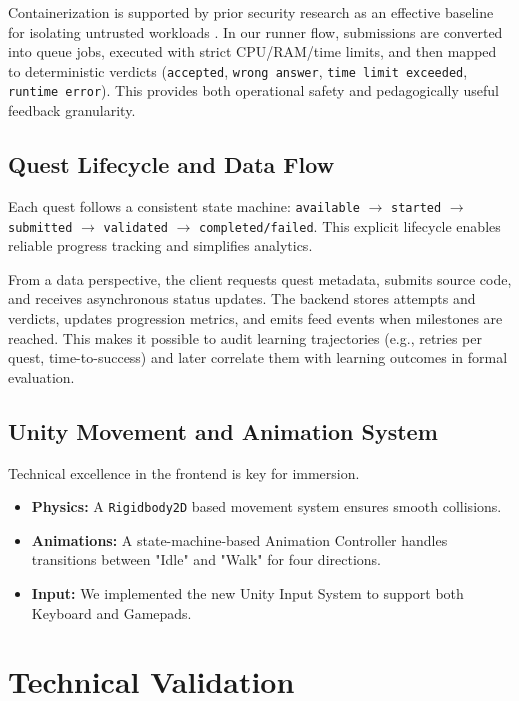 \documentclass[a4paper, UKenglish, cleveref, autoref, thm-restate]{oasics-v2021}
\begin{document}
Containerization is supported by prior security research as an effective baseline for isolating untrusted workloads \cite{combe2016docker,spacek2015docker}. In our runner flow, submissions are converted into queue jobs, executed with strict CPU/RAM/time limits, and then mapped to deterministic verdicts (\texttt{accepted}, \texttt{wrong answer}, \texttt{time limit exceeded}, \texttt{runtime error}). This provides both operational safety and pedagogically useful feedback granularity.

\subsection{Quest Lifecycle and Data Flow}
Each quest follows a consistent state machine: \texttt{available} $\rightarrow$ \texttt{started} $\rightarrow$ \texttt{submitted} $\rightarrow$ \texttt{validated} $\rightarrow$ \texttt{completed/failed}. This explicit lifecycle enables reliable progress tracking and simplifies analytics.

From a data perspective, the client requests quest metadata, submits source code, and receives asynchronous status updates. The backend stores attempts and verdicts, updates progression metrics, and emits feed events when milestones are reached. This makes it possible to audit learning trajectories (e.g., retries per quest, time-to-success) and later correlate them with learning outcomes in formal evaluation.

\subsection{Unity Movement and Animation System}
Technical excellence in the frontend is key for immersion.
\begin{itemize}
    \item \textbf{Physics:} A \texttt{Rigidbody2D} based movement system ensures smooth collisions.
    \item \textbf{Animations:} A state-machine-based Animation Controller handles transitions between "Idle" and "Walk" for four directions.
    \item \textbf{Input:} We implemented the new Unity Input System to support both Keyboard and Gamepads.
\end{itemize}

\section{Technical Validation}
\end{document}
